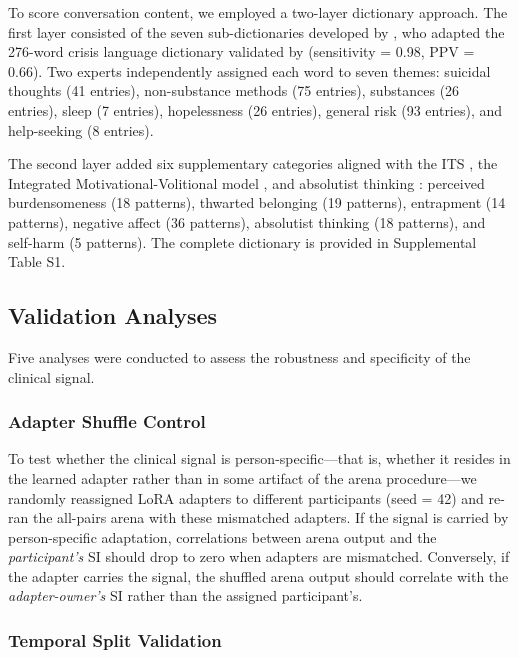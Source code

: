 \documentclass[review,12pt,authoryear]{elsarticle}
\begin{document}
To score conversation content, we employed a two-layer dictionary approach. The first layer consisted of the seven sub-dictionaries developed by \citet{ammerman2026dictionary}, who adapted the 276-word crisis language dictionary validated by \citet{swaminathan2023nlp} (sensitivity = 0.98, PPV = 0.66). Two experts independently assigned each word to seven themes: suicidal thoughts (41 entries), non-substance methods (75 entries), substances (26 entries), sleep (7 entries), hopelessness (26 entries), general risk (93 entries), and help-seeking (8 entries).

The second layer added six supplementary categories aligned with the ITS \citep{vanorden2010interpersonal}, the Integrated Motivational-Volitional model \citep{oconnor2011integrated}, and absolutist thinking \citep{almosaiwi2018absolute}: perceived burdensomeness (18 patterns), thwarted belonging (19 patterns), entrapment (14 patterns), negative affect (36 patterns), absolutist thinking (18 patterns), and self-harm (5 patterns). The complete dictionary is provided in Supplemental Table S1.

\subsection{Validation Analyses}

Five analyses were conducted to assess the robustness and specificity of the clinical signal.

\subsubsection{Adapter Shuffle Control}

To test whether the clinical signal is person-specific---that is, whether it resides in the learned adapter rather than in some artifact of the arena procedure---we randomly reassigned LoRA adapters to different participants (seed = 42) and re-ran the all-pairs arena with these mismatched adapters. If the signal is carried by person-specific adaptation, correlations between arena output and the \textit{participant's} SI should drop to zero when adapters are mismatched. Conversely, if the adapter carries the signal, the shuffled arena output should correlate with the \textit{adapter-owner's} SI rather than the assigned participant's.

\subsubsection{Temporal Split Validation}
\end{document}

